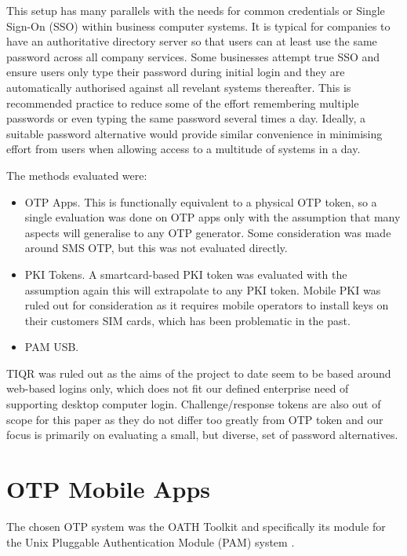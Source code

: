 \documentclass{report}
\begin{document}
This setup has many parallels with the needs for common credentials or
Single Sign-On (SSO) within business computer systems. It is typical for
companies to have an authoritative directory server so that users
can at least use the same password across all company services. Some businesses
attempt true SSO and ensure users only type their password during initial
login and they are automatically authorised against all revelant systems
thereafter. This is recommended practice to reduce some of the effort
remembering multiple passwords or even typing the same password several times
a day. Ideally, a suitable password alternative would provide similar
convenience in minimising effort from users when allowing access to a multitude
of systems in a day.

The methods evaluated were:

\begin{itemize}
  \item OTP Apps. This is functionally equivalent to a physical OTP token,
    so a single evaluation was done on OTP apps only with the assumption that
    many aspects will generalise to any OTP generator. Some consideration
    was made around SMS OTP, but this was not evaluated directly.
  \item PKI Tokens. A smartcard-based PKI token was evaluated with the
    assumption again this will extrapolate to any PKI token. Mobile PKI was
    ruled out for consideration as it requires mobile operators to install
    keys on their customers SIM cards, which has been problematic in the
    past.
  \item PAM USB.
\end{itemize}

TIQR was ruled out as the aims of the project to date seem to be based around
web-based logins only, which does not fit our defined enterprise need of
supporting desktop computer login. Challenge/response tokens are also
out of scope for this paper as they do not differ too greatly from OTP
token and our focus is primarily on evaluating a small, but diverse, set
of password alternatives.

\section{OTP Mobile Apps}

The chosen OTP system was the OATH Toolkit and specifically its
module for the Unix Pluggable Authentication Module (PAM) system
\parencite{samar1996unified}.
\end{document}
